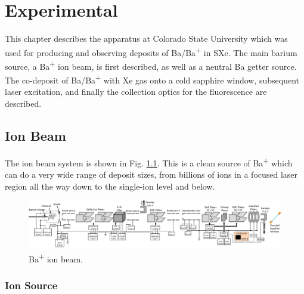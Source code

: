 \chapter{Experimental}



This chapter describes the apparatus at Colorado State University which was used for producing and observing  deposits of Ba/Ba\textsuperscript{+} in SXe.  The main barium source, a Ba\textsuperscript{+} ion beam, is first described, as well as a neutral Ba getter source.  The co-deposit of Ba/Ba\textsuperscript{+} with Xe gas onto a cold sapphire window, subsequent laser excitation, and finally the collection optics for the fluorescence are described.

\section{Ion Beam}

The ion beam system is shown in Fig. \ref{fig:ionbeam}.  This is a clean source of Ba\textsuperscript{+} which can do a very wide range of deposit sizes, from billions of ions in a focused laser region all the way down to the single-ion level and below.

\begin{figure} %
        \centering
                \includegraphics[angle=90,width=.25\textwidth]{figures/ionBeam.png} %
                \caption{Ba\textsuperscript{+} ion beam.}
\label{fig:ionbeam}
\end{figure}

\subsection{Ion Source}

